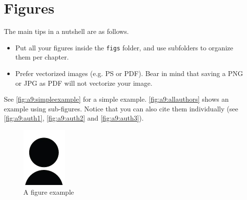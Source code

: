\section{Figures}
\label{sec:a9:latex_figures}

The main tips in a nutshell are as follows.
\begin{itemize}
    \item Put all your figures inside the \texttt{figs} folder,
          and use subfolders to organize them per chapter.
    \item Prefer vectorized images (e.g. PS or PDF).
          Bear in mind that saving a PNG or JPG as PDF
          will not vectorize your image.
\end{itemize}

See \autoref{fig:a9:simpleexample} for a simple example.
\autoref{fig:a9:allauthors} shows an example using sub-figures.
Notice that you can also cite them individually
(see \autoref{fig:a9:auth1}, \autoref{fig:a9:auth2} and \autoref{fig:a9:auth3}).

\begin{figure}
    \centering
    \includegraphics[width=.2\textwidth]{figs/author}
    \caption{A figure example}
    \label{fig:a9:simpleexample}
\end{figure}

